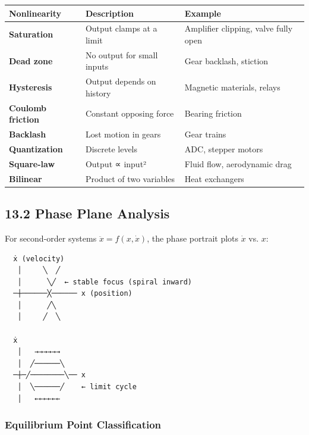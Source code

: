 \documentclass[11pt,a4paper]{book}
\begin{document}
\begin{itemize}
\begin{center}
\begin{tabular}{|l|l|l|}
\hline
Nonlinearity & Description & Example \\
\hline
\textbf{Saturation} & Output clamps at a limit & Amplifier clipping, valve fully open \\
\textbf{Dead zone} & No output for small inputs & Gear backlash, stiction \\
\textbf{Hysteresis} & Output depends on history & Magnetic materials, relays \\
\textbf{Coulomb friction} & Constant opposing force & Bearing friction \\
\textbf{Backlash} & Lost motion in gears & Gear trains \\
\textbf{Quantization} & Discrete levels & ADC, stepper motors \\
\textbf{Square-law} & Output ∝ input² & Fluid flow, aerodynamic drag \\
\textbf{Bilinear} & Product of two variables & Heat exchangers \\
\hline
\end{tabular}
\end{center}

\medskip\noindent\hrulefill\medskip

\subsection{13.2 Phase Plane Analysis}

For second-order systems $\ddot{x} = f(x, \dot{x})$, the phase portrait plots $\dot{x}$ vs. $x$:

\begin{lstlisting}
  ẋ (velocity)
   │     ╲  ╱
   │      ╲╱  ← stable focus (spiral inward)
  ─┼──────╳────── x (position)
   │      ╱╲
   │     ╱  ╲
   
  ẋ
   │   →→→→→→
   │  ╱──────╲
  ─┼─╱────────╲── x
   │  ╲──────╱    ← limit cycle
   │   ←←←←←←
\end{lstlisting}

\subsubsection{Equilibrium Point Classification}


\end{itemize}
\end{document}
